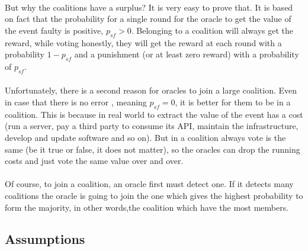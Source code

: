 \documentclass{article}
\begin{document}
\paragraph{ }
	But why the coalitions have a surplus? It is very easy to prove that. It is based on fact that the probability for a single round for the oracle to get the value of the event faulty is positive, $p_{sf}>0$. Belonging to a coalition will always get the reward, while voting honestly, they will get the reward at each round with a probability $1-p_{sf}$ and a punishment (or at least zero reward) with a probability of $p_{sf}$.
\paragraph{ }
	Unfortunately, there is a second reason for oracles to join a large coalition. Even in case that there is no error , meaning $p_{sf}=0$, it is better for them to be in a coalition. This is because in real world to extract the value of the event has a cost (run a server, pay a third party to consume its API, maintain the infrastructure, develop and update software and so on). But in a coalition always vote is the same (be it true or false, it does not matter), so the oracles can drop the running costs and just vote the same value over and over.
\paragraph{ }	
	Of course, to join a coalition, an oracle first must detect one. If it detects many coalitions the oracle is going to join the one which gives the highest probability to form the majority, in other words,the coalition which have the most members.

\subsection{Assumptions}
\end{document}
